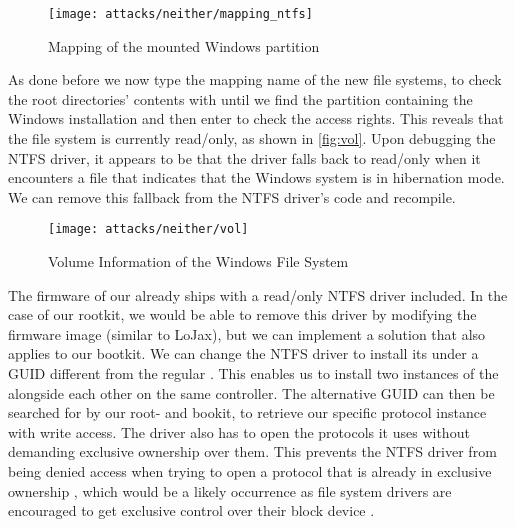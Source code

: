 \begin{figure}[htb]
    \centering
    \texttt{[image: attacks/neither/mapping\_ntfs]}
    \caption{Mapping of the mounted Windows partition}
    \label{fig:mapping-ntfs}
\end{figure}

As done before we now type the mapping name of the new file systems, to check the root directories' contents with  until we find the partition containing the Windows installation and then enter  to check the access rights.
This reveals that the file system is currently read\-/only, as shown in \autoref{fig:vol}.
Upon debugging the \ac{NTFS} driver, it appears to be that the driver falls back to read\-/only when it encounters a file that indicates that the Windows system is in hibernation mode.
We can remove this fallback from the \ac{NTFS} driver's code and recompile.

\begin{figure}[htb]
    \centering
    \texttt{[image: attacks/neither/vol]}
    \caption{Volume Information of the Windows File System}
    \label{fig:vol}
\end{figure}

The firmware of our  already ships with a read\-/only \ac{NTFS} driver included.
In the case of our rootkit, we would be able to remove this driver by modifying the firmware image (similar to LoJax), but we can implement a solution that also applies to our bootkit.
We can change the \ac{NTFS} driver to install its  under a \ac{GUID} different from the regular .
This enables us to install two instances of the  alongside each other on the same controller.
The alternative \ac{GUID} can then be searched for by our root- and bookit, to retrieve our specific protocol instance with write access.
The driver also has to open the protocols it uses without demanding exclusive ownership over them.
This prevents the \ac{NTFS} driver from being denied access when trying to open a protocol that is already in exclusive ownership \cite[Section 7.3]{uefi-spec}, which would be a likely occurrence as file system drivers are encouraged to get exclusive control over their block device \cite[Section 13.5]{uefi-spec}.

